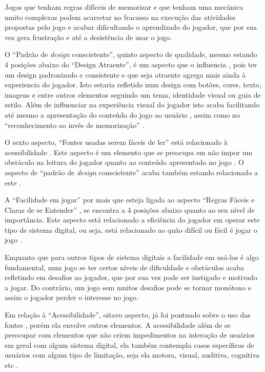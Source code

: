 Jogos que tenham regras difíceis de memorizar e que tenham uma mecânica muito complexas podem acarretar no fracasso na execução das atividades propostas pelo jogo e acabar dificultando o aprendizado do jogador, que por sua vez gera frustração e até a desistência de usar o jogo. 

O ``Padrão de \textit{design} conscistente'', quinto aspecto de qualidade, mesmo estando 4 posições abaixo do ``Design Atraente'', é um aspecto que o influencia \cite{Petri_Wangenheim_2019}, pois ter um design padronizado e consistente e que seja atraente agrega mais ainda à experiencia do jogador. Isto estaria refletido num design com botões, cores, texto, imagens e entre outros elementos seguindo um tema, identidade visual ou guia de estilo. Além de influenciar na experiência visual do jogador isto acaba facilitando até mesmo a apresentação do conteúdo do jogo ao usuário \cite{silva_sales_mendes2021}, assim como no ``reconhecimento ao invés de memorização'' \cite{nielsen1994}.

O sexto aspecto, ``Fontes usadas serem fáceis de ler'' está relacionado à acessibilidade \cite{Petri_Wangenheim_2019}. Este aspecto é um elemento que se preocupa em não impor um obstáculo na leitura do jogador quanto ao conteúdo apresentado no jogo \cite{silva_sales_mendes2021}. O aspecto de ``padrão de \textit{design} conscistente'' acaba também estando relacionado a este \cite{Petri_Wangenheim_2019}.

A ``Facilidade em jogar'' por mais que esteja ligada ao aspecto ``Regras Fáceis e Claras de se Entender'' \cite{Petri_Wangenheim_2019}, se encontra a 4 posições abaixo quanto ao seu nível de importância. Este aspecto está relacionado a eficiência do jogador em operar este tipo de sistema digital, ou seja, está relacionado ao quão difícil ou fácil é jogar o jogo \cite{silva_sales_mendes2021}. 

Enquanto que para outros tipos de sistema digitais a facilidade em usá-los é algo fundamental, num jogo se ter certos níveis de dificuldade e obstáculos acaba refletindo em desafios ao jogador, que por sua vez pode ser instigado e motivado a jogar. Do contrário, um jogo sem muitos desafios pode se tornar monótono e assim o jogador perder o interesse no jogo.  

Em relação à ``Acessibilidade'', oitavo aspecto, já foi pontuado sobre o uso das fontes \cite{Petri_Wangenheim_2019}, porém ela envolve outros elementos. A acessibilidade além de se preocupar com elementos que não criem impedimentos na interação de usuários em geral com algum sistema digital, ela também contempla casos específicos de usuários com algum tipo de limitação, seja ela motora, visual, auditiva, cognitiva etc \cite[p. 48]{BarbosaEtAl2021}.

